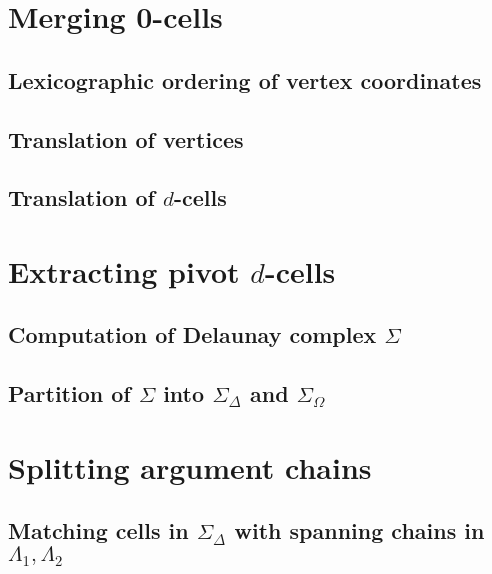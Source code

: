 \documentclass[11pt,oneside]{article}	%
\begin{document}
\section{Merging 0-cells}
\subsection{Lexicographic ordering of vertex coordinates}
\subsection{Translation of vertices}
\subsection{Translation of $d$-cells}
\section{Extracting pivot $d$-cells}
\subsection{Computation of Delaunay complex $\Sigma$}
\subsection{Partition of $\Sigma$ into $\Sigma_\Delta$ and $\Sigma_\Omega$}
\section{Splitting argument chains}
\subsection{Matching cells in $\Sigma_\Delta$ with spanning chains in $\Lambda_1,\Lambda_2$}
\end{document}
